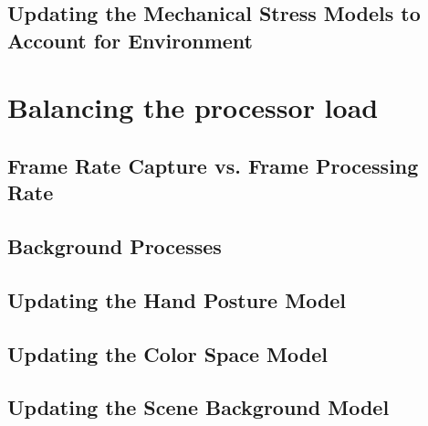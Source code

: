 \subsection{Updating the Mechanical Stress Models to Account for Environment}\label{sec:UpdatingMechanicalStressModelsToAccountForEnvironment}
\section{Balancing the processor load}\label{sec:BalancingTheProcessorLoad}
\subsection{Frame Rate Capture vs. Frame Processing Rate}\label{sec:FrameRateCaptureVsFrameProcessingRate}
\subsection{Background Processes}\label{sec:BackgroundProcesses}
\subsection{Updating the Hand Posture Model}\label{sec:UpdatingTheHandPostureModel}
\subsection{Updating the Color Space Model}\label{sec:UpdatingTheColorSpaceModel}
\subsection{Updating the Scene Background Model}\label{sec:UpdatingTheSceneBackgroundModel}
